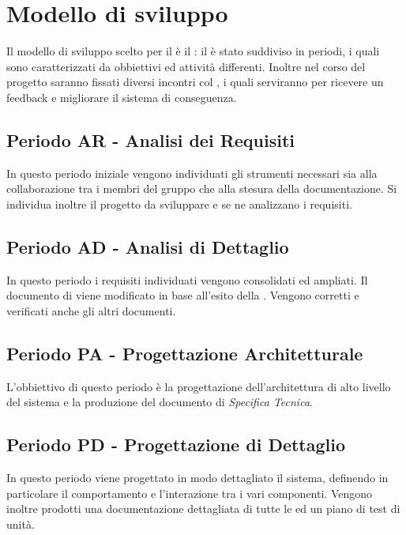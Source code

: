 \documentclass[./PianoDiProgetto.tex]{subfiles}
\begin{document}
  \section{Modello di sviluppo}

  Il modello di sviluppo scelto per il  è il : il
   è stato suddiviso in periodi, i quali sono caratterizzati da
  obbiettivi ed attività differenti. Inoltre nel corso del progetto saranno
  fissati diversi incontri col , i quali serviranno per ricevere un
  feedback e migliorare il sistema di conseguenza.

  \subsection{Periodo AR - Analisi dei Requisiti}

  In questo periodo iniziale vengono individuati gli strumenti necessari sia alla
  collaborazione tra i membri del gruppo che alla stesura della documentazione.
  Si individua inoltre il progetto da sviluppare e se ne analizzano i requisiti.

  \subsection{Periodo AD - Analisi di Dettaglio}

  In questo periodo i requisiti individuati vengono consolidati ed ampliati. Il
  documento di \ARdoc viene modificato in base all'esito
  della \RR. Vengono corretti e verificati anche gli altri documenti.

  \subsection{Periodo PA - Progettazione Architetturale}

  L'obbiettivo di questo periodo è la progettazione dell'architettura di alto
  livello del sistema e la produzione del documento di \textit{Specifica Tecnica}.

  \subsection{Periodo PD - Progettazione di Dettaglio}

  In questo periodo viene progettato in modo dettagliato il sistema, definendo
  in particolare il comportamento e l'interazione tra i vari componenti. Vengono
  inoltre prodotti una documentazione dettagliata di tutte le  ed un piano
  di test di unità.
\end{document}
